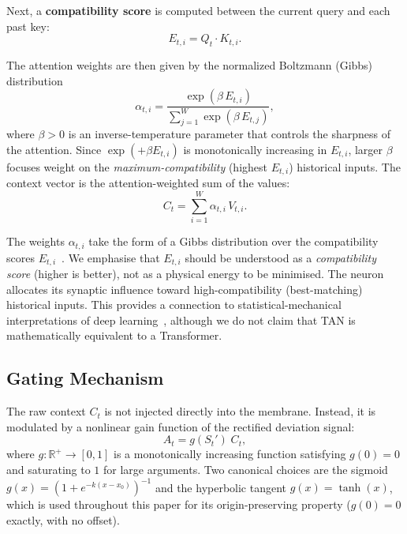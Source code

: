 Next, a \textbf{compatibility score} is computed between the current query and each past key:
\begin{equation}
E_{t,i} = Q_t \cdot K_{t,i}.
\end{equation}

The attention weights are then given by the normalized Boltzmann (Gibbs) distribution
\begin{equation}
\alpha_{t,i} = \frac{\exp(\beta \, E_{t,i})}{\sum_{j=1}^W \exp(\beta \, E_{t,j})},
\end{equation}
where $\beta > 0$ is an inverse-temperature parameter that controls the sharpness of the attention. Since $\exp(+\beta E_{t,i})$ is monotonically increasing in $E_{t,i}$, larger $\beta$ focuses weight on the \textit{maximum-compatibility} (highest $E_{t,i}$) historical inputs. The context vector is the attention-weighted sum of the values:
\begin{equation}
C_t = \sum_{i=1}^W \alpha_{t,i} \, V_{t,i}.
\end{equation}

The weights $\alpha_{t,i}$ take the form of a Gibbs distribution over the compatibility scores $E_{t,i}$~\cite{jaynes1957,boltzmann1868,gibbs1902}. We emphasise that $E_{t,i}$ should be understood as a \textit{compatibility score} (higher is better), not as a physical energy to be minimised. The neuron allocates its synaptic influence toward high-compatibility (best-matching) historical inputs. This provides a connection to statistical-mechanical interpretations of deep learning~\cite{bahri2020}, although we do not claim that TAN is mathematically equivalent to a Transformer.

\subsection{Gating Mechanism}

The raw context $C_t$ is not injected directly into the membrane. Instead, it is modulated by a nonlinear gain function of the rectified deviation signal:
\begin{equation}
A_t = g(S_t') \; C_t,
\end{equation}
where $g: \mathbb{R}^+ \to [0,1]$ is a monotonically increasing function satisfying $g(0) = 0$ and saturating to $1$ for large arguments. Two canonical choices are the sigmoid $g(x) = (1 + e^{-k(x-x_0)})^{-1}$ and the hyperbolic tangent $g(x) = \tanh(x)$, which is used throughout this paper for its origin-preserving property ($g(0) = 0$ exactly, with no offset).

